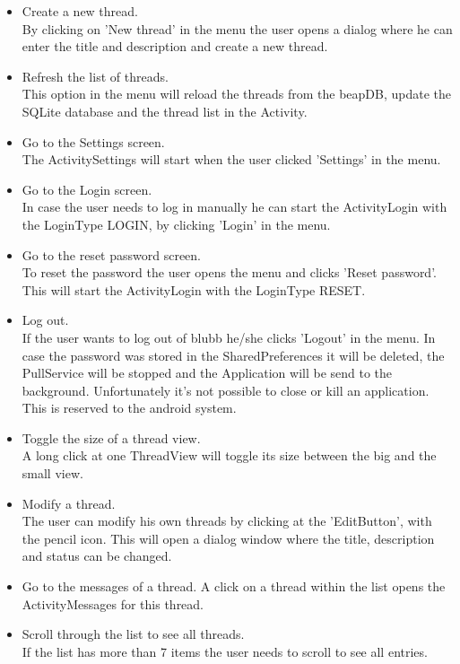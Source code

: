 \documentclass[12pt,a4paper,oneside]{report}
\newcommand{\appname}{blubb}
\newcommand{\beapDB}{beapDB}
\begin{document}
\begin{itemize}
\item{Create a new thread.}\\
By clicking on 'New thread' in the menu the user opens a dialog where he can enter the title and description and create a new thread.

\item{Refresh the list of threads.}\\
This option in the menu will reload the threads from the \beapDB{}, update the SQLite database and the thread list in the Activity.

\item{Go to the Settings screen.}\\
The ActivitySettings will start when the user clicked 'Settings' in the menu.

\item{Go to the Login screen.}\\
In case the user needs to log in manually he can start the ActivityLogin with the LoginType LOGIN, by clicking 'Login' in the menu. 

\item{Go to the reset password screen.}\\
To reset the password the user opens the menu and clicks 'Reset password'. This will start the ActivityLogin with the LoginType RESET.

\item{Log out.}\\
If the user wants to log out of \appname{} he/she clicks 'Logout' in the menu. In case the password was stored in the SharedPreferences it will be deleted, the PullService will be stopped and the Application will be send to the background. Unfortunately it's not possible to close or kill an application. This is reserved to the android system.

\item{Toggle the size of  a thread view.}\\
A long click at one ThreadView will toggle its size between the big and the small view.

\item{Modify a thread.}\\
The user can modify his own threads by clicking at the 'EditButton', with the pencil icon. This will open a dialog window where the title, description and status can be changed.

\item{Go to the messages of a thread.}
A click on a thread within the list opens the ActivityMessages for this thread. 

\item{Scroll through the list to see all threads.}\\
If the list has more than 7 items the user needs to scroll to see all entries.

\end{itemize} 
\end{document}
